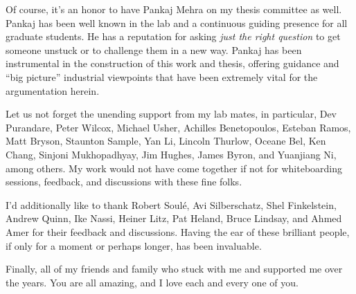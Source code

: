 Of course, it's an honor to have Pankaj Mehra on my thesis committee as well. Pankaj has been well known in the lab and
a continuous guiding presence for all graduate students. He has a reputation for asking \emph{just the right question}
to get someone unstuck or to challenge them in a new way. Pankaj has been instrumental in the construction of this work
and thesis, offering guidance and ``big picture'' industrial viewpoints that have been extremely vital for the
argumentation herein.

Let us not forget the unending support from my lab mates, in particular, Dev Purandare, Peter Wilcox, Michael Usher,
Achilles Benetopoulos, Esteban Ramos, Matt Bryson, Staunton Sample, Yan Li, Lincoln Thurlow, Oceane Bel, Ken Chang,
Sinjoni Mukhopadhyay, Jim Hughes, James Byron, and Yuanjiang Ni, among others. My work would not have come together if not for whiteboarding
sessions, feedback, and discussions with these fine folks.

I'd additionally like to thank Robert Soulé, Avi Silberschatz, Shel Finkelstein, Andrew Quinn, Ike Nassi, Heiner Litz,
Pat Heland, Bruce Lindsay, and Ahmed Amer for their feedback and discussions. Having the ear of these brilliant people,
if only for a moment or perhaps longer, has been invaluable.

Finally, all of my friends and family who stuck with me and supported me over the years. You are all amazing, and I love each and
every one of you.



\endgroup
